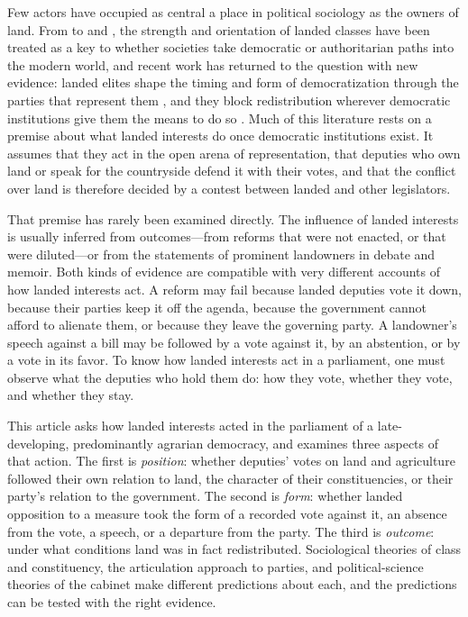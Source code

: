 \documentclass[12pt]{article}
\begin{document}
Few actors have occupied as central a place in political sociology as the owners of land. From \citet{moore1966} to \citet{paige1975} and \citet{skocpol1979}, the strength and orientation of landed classes have been treated as a key to whether societies take democratic or authoritarian paths into the modern world, and recent work has returned to the question with new evidence: landed elites shape the timing and form of democratization through the parties that represent them \citep{ziblatt2017}, and they block redistribution wherever democratic institutions give them the means to do so \citep{albertus2015}. Much of this literature rests on a premise about what landed interests do once democratic institutions exist. It assumes that they act in the open arena of representation, that deputies who own land or speak for the countryside defend it with their votes, and that the conflict over land is therefore decided by a contest between landed and other legislators.

That premise has rarely been examined directly. The influence of landed interests is usually inferred from outcomes---from reforms that were not enacted, or that were diluted---or from the statements of prominent landowners in debate and memoir. Both kinds of evidence are compatible with very different accounts of how landed interests act. A reform may fail because landed deputies vote it down, because their parties keep it off the agenda, because the government cannot afford to alienate them, or because they leave the governing party. A landowner's speech against a bill may be followed by a vote against it, by an abstention, or by a vote in its favor. To know how landed interests act in a parliament, one must observe what the deputies who hold them do: how they vote, whether they vote, and whether they stay.

This article asks how landed interests acted in the parliament of a late-developing, predominantly agrarian democracy, and examines three aspects of that action. The first is \textit{position}: whether deputies' votes on land and agriculture followed their own relation to land, the character of their constituencies, or their party's relation to the government. The second is \textit{form}: whether landed opposition to a measure took the form of a recorded vote against it, an absence from the vote, a speech, or a departure from the party. The third is \textit{outcome}: under what conditions land was in fact redistributed. Sociological theories of class and constituency, the articulation approach to parties, and political-science theories of the cabinet make different predictions about each, and the predictions can be tested with the right evidence.
\end{document}

